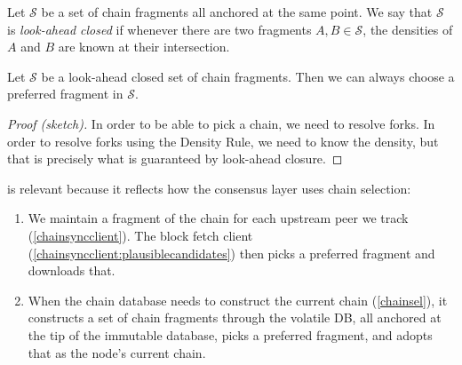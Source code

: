 \begin{definition}
\label{lookahead-closure}
Let $\mathcal{S}$ be a set of chain fragments all anchored at the same point. We
say that $\mathcal{S}$ is \emph{look-ahead closed} if whenever there are two
fragments $A, B \in \mathcal{S}$, the densities of $A$ and $B$ are known at
their intersection.
\end{definition}

\begin{lemma}
\label{lemma:fragment-selection}
Let $\mathcal{S}$ be a look-ahead closed set of chain fragments. Then
we can always choose a preferred fragment in $\mathcal{S}$.
\end{lemma}

\begin{proof}[Proof (sketch)]
In order to be able to pick a chain, we need to resolve forks. In order to
resolve forks using the Density Rule, we need to know the density, but that
is precisely what is guaranteed by look-ahead closure.
\end{proof}

 is relevant because it reflects how the
consensus layer uses chain selection:

\begin{enumerate}
\item We maintain a fragment of the chain for each upstream peer we track
(\cref{chainsyncclient}). The block fetch client
(\cref{chainsyncclient:plausiblecandidates}) then picks a preferred fragment and
downloads that.
\item When the chain database needs to construct the current chain
(\cref{chainsel}), it constructs a set of chain fragments through the volatile
DB, all anchored at the tip of the immutable database, picks a preferred
fragment, and adopts that as the node's current chain.
\end{enumerate}

